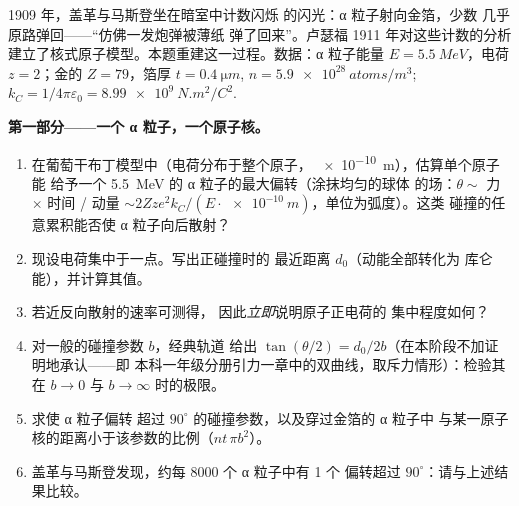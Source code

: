 \begin{problem}\label{pb:b3:scattering-theory:1}
1909 年，盖革与马斯登坐在暗室中计数闪烁
的闪光：α 粒子射向金箔，少数
几乎原路弹回——“仿佛一发炮弹被薄纸
弹了回来”。卢瑟福 1911 年对这些计数的分析
建立了核式原子模型。本题重建这一过程。数据：α 粒子能量 $E =
\qty{5.5}{MeV}$，电荷 $z = 2$；金的 $Z = 79$，箔厚 $t
= \qty{0.4}{\micro m}$, $n = \qty{5.9e28}{atoms/m^3}$; $k_C =
1/4\pi\varepsilon_0 = \qty{8.99e9}{N.m^2/C^2}$.

\medskip\noindent\textbf{第一部分——一个 α 粒子，一个原子核。}
\begin{enumerate}
  \item 在葡萄干布丁模型中（电荷分布于整个原子，
        \qty{e-10}{m}），估算单个原子能
        给予一个 \qty{5.5}{MeV} 的 α 粒子的最大偏转（涂抹均匀的球体
        的场：$\theta \sim$ 力 $\times$ 时间 / 动量
        $\sim 2Zze^2k_C/(E\cdot\qty{e-10}{m})$，单位为弧度）。这类
        碰撞的任意累积能否使 α 粒子向后散射？
  \item 现设电荷集中于一点。写出正碰撞时的
        最近距离 $d_0$（动能全部转化为
        库仑能），并计算其值。
  \item 若近反向散射的速率可测得，
        因此\emph{立即}说明原子正电荷的
        集中程度如何？
  \item 对一般的碰撞参数 $b$，经典轨道
        给出 $\tan(\theta/2) = d_0/2b$（在本阶段不加证明地承认——即
        本科一年级分册引力一章中的双曲线，取斥力情形）：检验其在
        $b \to 0$ 与 $b \to
        \infty$ 时的极限。
  \item 求使 α 粒子偏转
        超过 $90^\circ$ 的碰撞参数，以及穿过金箔的 α 粒子中
        与某一原子核的距离小于该参数的比例（$n t\,\pi
        b^2$）。
  \item 盖革与马斯登发现，约每 8000 个 α 粒子中有 1 个
        偏转超过 $90^\circ$：请与上述结果比较。
\end{enumerate}


\end{problem}
